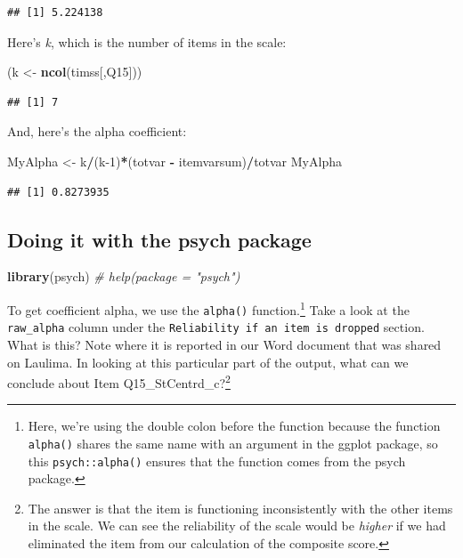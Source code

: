 \documentclass[
]{article}
\newenvironment{Shaded}{\begin{snugshade}}{\end{snugshade}}
\newcommand{\CommentTok}[1]{\textcolor[rgb]{0.56,0.35,0.01}{\textit{#1}}}
\newcommand{\DecValTok}[1]{\textcolor[rgb]{0.00,0.00,0.81}{#1}}
\newcommand{\KeywordTok}[1]{\textcolor[rgb]{0.13,0.29,0.53}{\textbf{#1}}}
\newcommand{\NormalTok}[1]{#1}
\newcommand{\OperatorTok}[1]{\textcolor[rgb]{0.81,0.36,0.00}{\textbf{#1}}}
\newcommand{\StringTok}[1]{\textcolor[rgb]{0.31,0.60,0.02}{#1}}
\begin{document}
\begin{verbatim}
## [1] 5.224138
\end{verbatim}

Here's \emph{k}, which is the number of items in the scale:

\begin{Shaded}
\begin{Highlighting}[]
\NormalTok{(k <-}\StringTok{ }\KeywordTok{ncol}\NormalTok{(timss[,Q15]))}
\end{Highlighting}
\end{Shaded}

\begin{verbatim}
## [1] 7
\end{verbatim}

And, here's the alpha coefficient:

\begin{Shaded}
\begin{Highlighting}[]
\NormalTok{MyAlpha <-}\StringTok{ }\NormalTok{k}\OperatorTok{/}\NormalTok{(k}\DecValTok{-1}\NormalTok{)}\OperatorTok{*}\NormalTok{(totvar }\OperatorTok{-}\StringTok{ }\NormalTok{itemvarsum)}\OperatorTok{/}\NormalTok{totvar}
\NormalTok{MyAlpha}
\end{Highlighting}
\end{Shaded}

\begin{verbatim}
## [1] 0.8273935
\end{verbatim}

\hypertarget{doing-it-with-the-psych-package}{%
\subsection{Doing it with the psych package}\label{doing-it-with-the-psych-package}}

\begin{Shaded}
\begin{Highlighting}[]
\KeywordTok{library}\NormalTok{(psych)}
\CommentTok{# help(package = "psych")}
\end{Highlighting}
\end{Shaded}

To get coefficient alpha, we use the \texttt{alpha()} function.\footnote{Here, we're using the double colon before the function because the function \texttt{alpha()} shares the same name with an argument in the ggplot package, so this \texttt{psych::alpha()} ensures that the function comes from the psych package.} Take a look at the \texttt{raw\_alpha} column under the \texttt{Reliability\ if\ an\ item\ is\ dropped} section. What is this? Note where it is reported in our Word document that was shared on Laulima. In looking at this particular part of the output, what can we conclude about Item Q15\_StCentrd\_c?\footnote{The answer is that the item is functioning inconsistently with the other items in the scale. We can see the reliability of the scale would be \emph{higher} if we had eliminated the item from our calculation of the composite score.}
\end{document}

